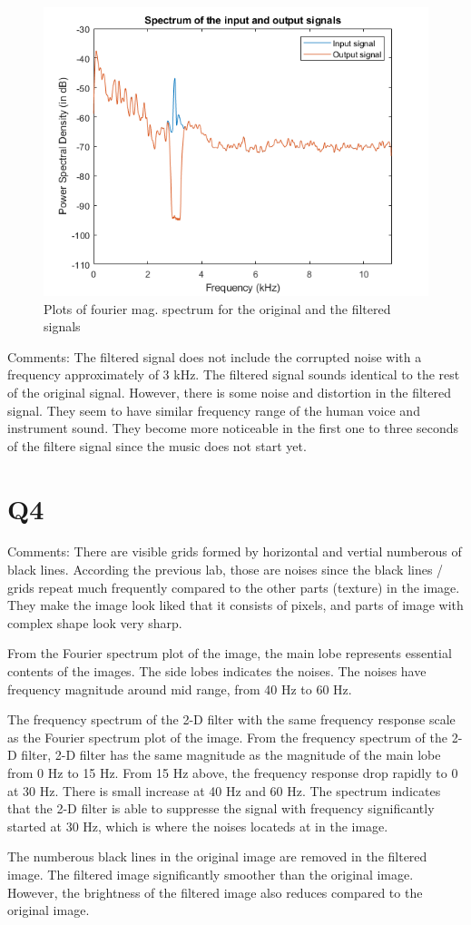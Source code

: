\documentclass{article}
\begin{document}
\begin{figure}[h!]
\includegraphics[width=\textwidth]{BSFresult.png}
\caption{Plots of fourier mag. spectrum for the original and the filtered signals}
\end{figure}

Comments: The filtered signal does not include the corrupted noise with a frequency approximately of 3 kHz. The filtered signal sounds identical to the rest of the original signal. However, there is some noise and distortion in the filtered signal. They seem to have similar frequency range of the human voice and instrument sound. They become more noticeable in the first one to three seconds of the filtere signal since the music does not start yet.

\section*{Q4}

Comments: There are visible grids formed by horizontal and vertial numberous of black lines. According the previous lab, those are noises since the black lines / grids repeat much frequently compared to the other parts (texture) in the image. They make the image look liked that it consists of pixels, and parts of image with complex shape look very sharp. 

From the Fourier spectrum plot of the image, the main lobe represents essential contents of the images. The side lobes indicates the noises. The noises have frequency magnitude around mid range, from 40 Hz to 60 Hz. 

The frequency spectrum of the 2-D filter with the same frequency response scale as the Fourier spectrum plot of the image. From the frequency spectrum of the 2-D filter, 2-D filter has the same magnitude as the magnitude of the main lobe from 0 Hz to 15 Hz. From 15 Hz above, the frequency response drop rapidly to 0 at 30 Hz. There is small increase at 40 Hz and 60 Hz. The spectrum indicates that the 2-D filter is able to suppresse the signal with frequency significantly started at 30 Hz, which is where the noises locateds at in the image. 

The numberous black lines in the original image are removed in the filtered image. The filtered image significantly smoother than the original image. However, the brightness of the filtered image also reduces compared to the original image.
\end{document}
